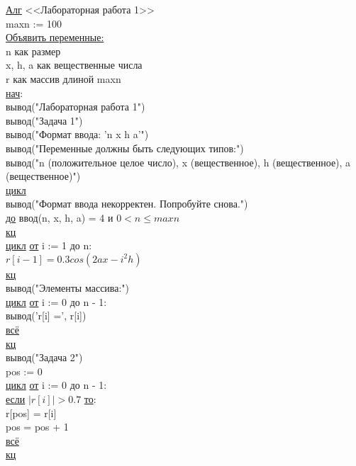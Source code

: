 \underline{Алг} <<Лабораторная работа 1>>\\
maxn := 100\\

\noindent \underline{Объявить переменные:}\\
\null\qquad n как размер\\
\null\qquad x, h, a как вещественные числа\\
\null\qquad r как массив длиной maxn\\[0.3cm]

\noindent\underline{нач}:\\
\null\qquad вывод("Лабораторная работа 1")\\
\null\qquad вывод("Задача 1")\\
\null\qquad вывод("Формат ввода: 'n x h a'")\\
\null\qquad вывод("Переменные должны быть следующих типов:")\\
\null\qquad вывод("n (положительное целое число), x (вещественное), h (вещественное), a (вещественное)")\\[0.3cm]

\noindent\null\qquad\underline{цикл}\\
\null\qquad\null\qquad вывод("Формат ввода некорректен. Попробуйте снова.")\\
\null\qquad\underline{до} ввод(n, x, h, a) = 4 и \(0 < n \leq maxn\) \\
\null\qquad\underline{кц}\\[0.3cm]

\noindent\null\qquad\underline{цикл} \underline{от} i := 1 до n:\\
\null\qquad\null\qquad \(r[i - 1] = 0.3 cos(2 a x - i^2 h)\)\\
\null\qquad\underline{кц}\\[0.3cm]

\noindent\null\qquad вывод("Элементы массива:")\\
\noindent\null\qquad\underline{цикл} \underline{от} i := 0 до n - 1:\\
\null\qquad\null\qquad вывод('r[i] =', r[i])\\
\null\qquad\null\qquad \underline{всё}\\
\null\qquad\underline{кц}\\[0.3cm]

\noindent\null\qquad вывод("Задача 2")\\
\null\qquad pos := 0\\
\null\qquad\underline{цикл} \underline{от} i := 0 до n - 1:\\
\null\qquad\null\qquad \underline{если} \(\vert r[i] \vert > 0.7\) \underline{то}:\\
\null\qquad\null\qquad\qquad r[pos] = r[i]\\
\null\qquad\null\qquad\qquad pos = pos + 1\\
\null\qquad\underline{всё}\\
\null\qquad\underline{кц}\\[0.3cm]

